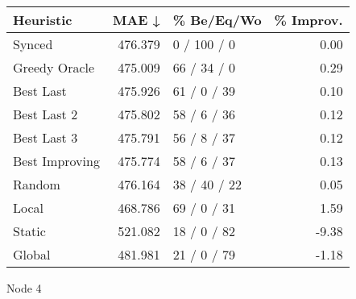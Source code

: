 \begin{tabular}{lrlr}
\toprule
\textbf{Heuristic} & \textbf{MAE ↓} & \textbf{\% Be/Eq/Wo} & \textbf{\% Improv.} \\
\midrule
            Synced &        476.379 &          0 / 100 / 0 &                0.00 \\
     Greedy Oracle &        475.009 &          66 / 34 / 0 &                0.29 \\
         Best Last &        475.926 &          61 / 0 / 39 &                0.10 \\
       Best Last 2 &        475.802 &          58 / 6 / 36 &                0.12 \\
       Best Last 3 &        475.791 &          56 / 8 / 37 &                0.12 \\
    Best Improving &        475.774 &          58 / 6 / 37 &                0.13 \\
            Random &        476.164 &         38 / 40 / 22 &                0.05 \\
             Local &        468.786 &          69 / 0 / 31 &                1.59 \\
            Static &        521.082 &          18 / 0 / 82 &               -9.38 \\
            Global &        481.981 &          21 / 0 / 79 &               -1.18 \\
\bottomrule
\end{tabular}
\caption{Node 4}
\label{tab:iid_lr01_le2_bs4_4}
